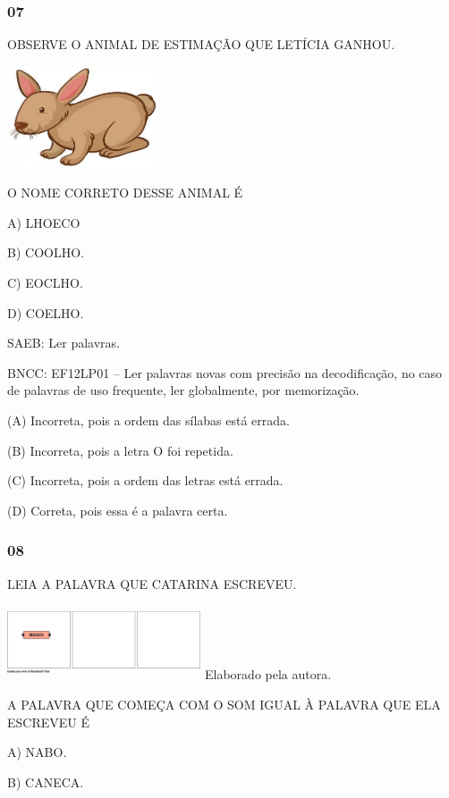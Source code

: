 \subsubsection{07}\label{section-79}

OBSERVE O ANIMAL DE ESTIMAÇÃO QUE LETÍCIA GANHOU.

\includegraphics[width=1.75903in,height=1.18611in]{media/image246.jpg}

O NOME CORRETO DESSE ANIMAL É

A) LHOECO

B) COOLHO.

C) EOCLHO.

D) COELHO.

SAEB: Ler palavras.

BNCC: EF12LP01 -- Ler palavras novas com precisão na decodificação, no caso de
palavras de uso frequente, ler globalmente, por memorização.

(A) Incorreta, pois a ordem das sílabas está errada.

(B) Incorreta, pois a letra O foi repetida.

(C) Incorreta, pois a ordem das letras está errada.

(D) Correta, pois essa é a palavra
certa.\protect\hypertarget{_heading=h.9bc4fu3nu5it}{}{}

\subsubsection{08}\label{section-80}

LEIA A PALAVRA QUE CATARINA ESCREVEU.

\includegraphics[width=2.25361in,height=0.86599in]{media/image247.png}
Elaborado pela autora.

A PALAVRA QUE COMEÇA COM O SOM IGUAL À PALAVRA QUE ELA ESCREVEU É

A) NABO.

B) CANECA.

